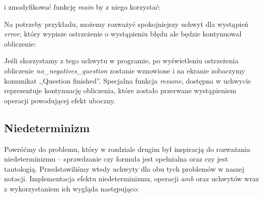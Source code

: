


i zmodyfikować funkcję \textit{main} by z niego korzystać:




Na potrzeby przykładu, możemy rozważyć spokojniejszy uchwyt dla wystąpień \textit{error}, który wypisze ostrzeżenie o wystąpieniu błędu ale będzie kontynuował obliczenie:




Jeśli skorzystamy z tego uchwytu w programie, po wyświetleniu ostrzeżenia obliczenie \textit{no\_negatives\_question} zostanie wznowione i na ekranie zobaczymy komunikat ,,Question finished''. Specjalna funkcja \textit{resume}, dostępna w uchwycie reprezentuje kontynuację obliczenia, które zostało przerwane wystąpieniem operacji powodującej efekt uboczny.

\subsection{Niedeterminizm}

Powróćmy do problemu, który w rozdziale drugim był inspiracją do rozważania niedeterminizmu -- sprawdzanie czy formuła jest spełnialna oraz czy jest tautologią. Przedstawiliśmy wtedy uchwyty dla obu tych problemów w naszej notacji. Implementacja efektu niedeterminizmu, operacji \textit{amb} oraz uchwytów wraz z wykorzystaniem ich wygląda następująco:

